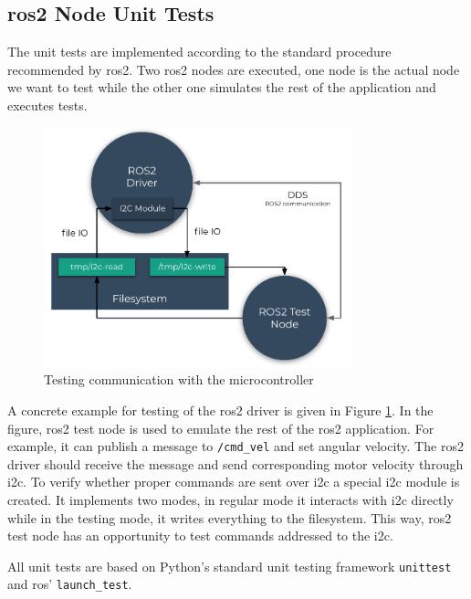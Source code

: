 \subsection{\ac{ros2} Node Unit Tests}

The unit tests are implemented according to the standard procedure recommended by \ac{ros2}.
Two \ac{ros2} nodes are executed, one node is the actual node we want to test while the other one simulates the rest of the application and executes tests. 

\begin{figure}[H]
    \centering
    \includegraphics[width=0.8\textwidth]{physical/figures/mocking.pdf}
    \caption{Testing communication with the microcontroller}
    \label{fig:physical:mocking}
\end{figure}

A concrete example for testing of the \ac{ros2} driver is given in Figure \ref{fig:physical:mocking}.
In the figure, \ac{ros2} test node is used to emulate the rest of the \ac{ros2} application.
For example, it can publish a message to \texttt{/cmd\_vel} and set angular velocity.
The \ac{ros2} driver should receive the message and send corresponding motor velocity through \ac{i2c}.
To verify whether proper commands are sent over \ac{i2c} a special \ac{i2c} module is created.
It implements two modes, in regular mode it interacts with \ac{i2c} directly while in the testing mode, it writes everything to the filesystem. 
This way, \ac{ros2} test node has an opportunity to test commands addressed to the \ac{i2c}.

All unit tests are based on Python's standard unit testing framework \texttt{unittest} and \ac{ros}' \texttt{launch\_test}.

